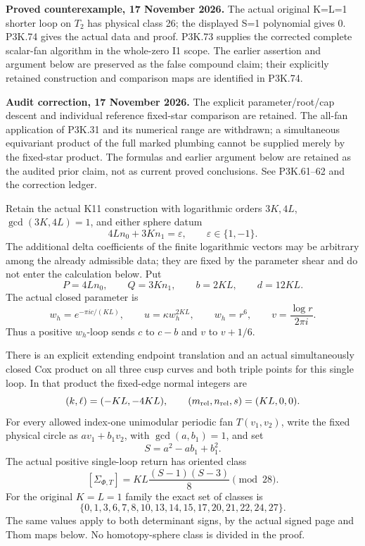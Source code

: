 \begin{theorem}\label{night:P3K.33}
\par\noindent\textbf{Proved counterexample, 17 November 2026.} The actual original K=L=1 shorter loop on \(T_2\) has physical class 26; the displayed S=1 polynomial gives 0. P3K.74 gives the actual data and proof. P3K.73 supplies the corrected complete scalar-fan algorithm in the whole-zero I1 scope. The earlier assertion and argument below are preserved as the false compound claim; their explicitly retained construction and comparison maps are identified in P3K.74.

\par\noindent\textbf{Audit correction, 17 November 2026.} The explicit parameter/root/cap descent and individual reference fixed-star comparison are retained. The all-fan application of P3K.31 and its numerical range are withdrawn; a simultaneous equivariant product of the full marked plumbing cannot be supplied merely by the fixed-star product. The formulas and earlier argument below are retained as the audited prior claim, not as current proved conclusions. See P3K.61--62 and the correction ledger.
\medskip

Retain the actual K11 construction with logarithmic orders \(3K,4L\),
\(\gcd(3K,4L)=1\), and either sphere datum
\[
       4Ln_0+3Kn_1=\varepsilon,\qquad \varepsilon\in\{1,-1\}.
\]
The additional delta coefficients of the finite logarithmic vectors may
be arbitrary among the already admissible data; they are fixed by the
parameter shear and do not enter the calculation below. Put
\[
 P=4Ln_0,\qquad Q=3Kn_1,\qquad b=2KL,\qquad d=12KL.
\]
The actual closed parameter is
\[
 w_h=e^{-\pi i c/(KL)},\qquad u=\kappa w_h^{2KL},
 \qquad w_h=r^6,\qquad v=\frac{\log r}{2\pi i}.
\]
Thus a positive \(w_h\)-loop sends \(c\) to \(c-b\) and
\(v\) to \(v+1/6\).

There is an explicit extending endpoint translation and an actual
simultaneously closed Cox product on all three cusp curves and both
triple points for this single loop. In that product the fixed-edge
normal integers are
\[
          (k,\ell)=(-KL,-4KL),\qquad
          (m_{\rm rel},n_{\rm rel},s)=(KL,0,0).
\]
For every allowed index-one unimodular periodic fan \(T(v_1,v_2)\),
write the fixed physical circle as \(a v_1+b_1v_2\), with
\(\gcd(a,b_1)=1\), and set
\[
                 S=a^2-ab_1+b_1^2.
\]
The actual positive single-loop return has oriented class
\[
       [\Sigma_{\Phi,T}]
          =KL\frac{(S-1)(S-3)}8\pmod {28}.                 \tag{P3K.33.1}
\]
For the original \(K=L=1\) family the exact set of classes is
\[
 \{0,1,3,6,7,8,10,13,14,15,17,20,21,22,24,27\}.
\]
The same values apply to both determinant signs, by the actual signed
page and Thom maps below. No homotopy-sphere class is divided in the proof.
\end{theorem}
